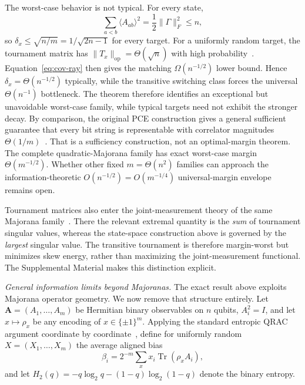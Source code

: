 \documentclass[10pt,aps,pra,twocolumn,superscriptaddress,nofootinbib,longbibliography]{revtex4-2}
\newcommand{\Tr}{\operatorname{Tr}}
\newcommand{\op}{\mathrm{op}}
\begin{document}
The worst-case behavior is not typical.  For every state,
\begin{equation}
    \sum_{a<b}\langle A_{ab}\rangle^2
    =\frac12\|\Gamma\|_F^2\le n,
    \label{eq:frobenius-envelope}
\end{equation}
so $\delta_x\le\sqrt{n/m}=1/\sqrt{2n-1}$ for every target.  For a uniformly random target, the tournament matrix has $\|T_x\|_{\op}=\Theta(\sqrt n)$ with high probability~\cite{Vershynin2018HDP}.  Equation~\eqref{eq:cov-ray} then gives the matching $\Omega(n^{-1/2})$ lower bound.  Hence $\delta_x=\Theta(n^{-1/2})$ typically, while the transitive switching class forces the universal $\Theta(n^{-1})$ bottleneck.  The theorem therefore identifies an exceptional but unavoidable worst-case family, while typical targets need not exhibit the stronger decay.  By comparison, the original PCE construction gives a general sufficient guarantee that every bit string is representable with correlator magnitudes $\Theta(1/m)$~\cite{Sciorilli2025PCE}.  That is a sufficiency construction, not an optimal-margin theorem.  The complete quadratic-Majorana family has exact worst-case margin $\Theta(m^{-1/2})$.  Whether other fixed $m=\Theta(n^2)$ families can approach the information-theoretic $O(n^{-1/2})=O(m^{-1/4})$ universal-margin envelope remains open.

Tournament matrices also enter the joint-measurement theory of the same Majorana family~\cite{McNulty2025FermionicJoint}.  There the relevant extremal quantity is the \emph{sum} of tournament singular values, whereas the state-space construction above is governed by the \emph{largest} singular value.  The transitive tournament is therefore margin-worst but minimizes skew energy, rather than maximizing the joint-measurement functional.  The Supplemental Material makes this distinction explicit.

\emph{General information limits beyond Majoranas.}
The exact result above exploits Majorana operator geometry.  We now remove that structure entirely.  Let $\mathbf A=(A_1,\ldots,A_m)$ be Hermitian binary observables on $n$ qubits, $A_i^2=I$, and let $x\mapsto\rho_x$ be any encoding of $x\in\{\pm1\}^m$.  Applying the standard entropic QRAC argument coordinate by coordinate~\cite{Nayak1999QRAC,Ambainis1999DenseCoding}, define for uniformly random $X=(X_1,\ldots,X_m)$ the average aligned bias
\begin{equation}
    \beta_i=2^{-m}\sum_x x_i\Tr(\rho_xA_i),
    \label{eq:beta}
\end{equation}
and let $H_2(q)=-q\log_2 q-(1-q)\log_2(1-q)$ denote the binary entropy.
\end{document}
